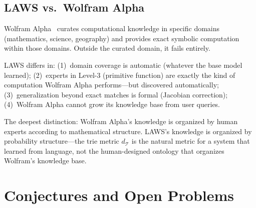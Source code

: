 \documentclass[11pt]{article}
\begin{document}
\subsection{LAWS vs.\ Wolfram Alpha}

Wolfram Alpha~\cite{wolfram2002} curates computational knowledge in specific
domains (mathematics, science, geography) and provides exact symbolic
computation within those domains.  Outside the curated domain, it fails entirely.

LAWS differs in: (1)~domain coverage is automatic (whatever the base model
learned); (2)~experts in Level-3 (primitive function) are exactly the kind of
computation Wolfram Alpha performs---but discovered automatically;
(3)~generalization beyond exact matches is formal (Jacobian correction);
(4)~Wolfram Alpha cannot grow its knowledge base from user queries.

The deepest distinction: Wolfram Alpha's knowledge is organized by human
experts according to mathematical structure.  LAWS's knowledge is organized
by probability structure---the trie metric $d_{\mathcal{T}}$ is the natural
metric for a system that learned from language, not the human-designed
ontology that organizes Wolfram's knowledge base.

\section{Conjectures and Open Problems}
\label{sec:conjectures}
\end{document}
